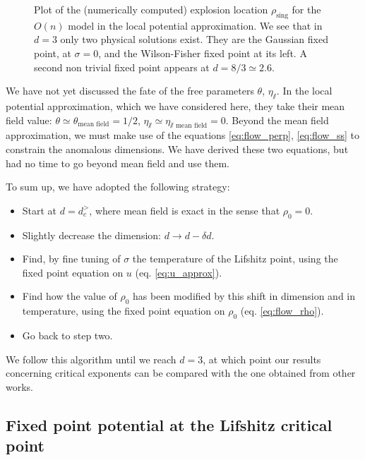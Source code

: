 \begin{figure}[htp]
\begin{subfigure}{.55\textwidth}
	\caption{}
	\label{on_d_2p6}
\end{subfigure}
\caption{Plot of the (numerically computed) explosion location $\rho_{\text{sing}}$ for the $O(n)$ model in the local potential approximation. We see that in $d=3$ only two physical solutions exist. They are the Gaussian fixed point, at $\sigma = 0$, and the Wilson-Fisher fixed point at its left. A second non trivial fixed point appears at $d = 8/3 \simeq 2.6$.}
\label{fig:on_fp}
\end{figure}

We have not yet discussed the fate of the free parameters $\theta$, $\eta_\sslash$. In the local potential approximation, which we have considered here, they take their mean field value: $\theta \simeq \theta_{\text{mean field}} =  1/2$, $\eta_\sslash \simeq \eta_{\sslash\text{~mean field}} = 0$.
Beyond the mean field approximation, we must make use of the equations \eqref{eq:flow_perp}, \eqref{eq:flow_ss} to constrain the anomalous dimensions. We have derived these two equations, but had no time to go beyond mean field and use them.


To sum up, we have adopted the following strategy:
\begin{itemize}
\item Start at $d=d_c^>$, where mean field is exact in the sense that $\rho_0 = 0$.
\item Slightly decrease the dimension: $d \rightarrow d - \delta d$. 
\item Find, by fine tuning of $\sigma$ the temperature of the Lifshitz point, using the fixed point equation on $u$ (eq. \eqref{eq:u_approx}).
\item Find how the value of $\rho_0$ has been modified by this shift in dimension and in temperature, using the fixed point equation on $\rho_0$ (eq. \eqref{eq:flow_rho}).
\item Go back to step two.
\end{itemize}
We follow this algorithm until we reach $d=3$, at which point our results concerning critical exponents can be compared with the one obtained from other works.

\subsection{Fixed point potential at the Lifshitz critical point}

